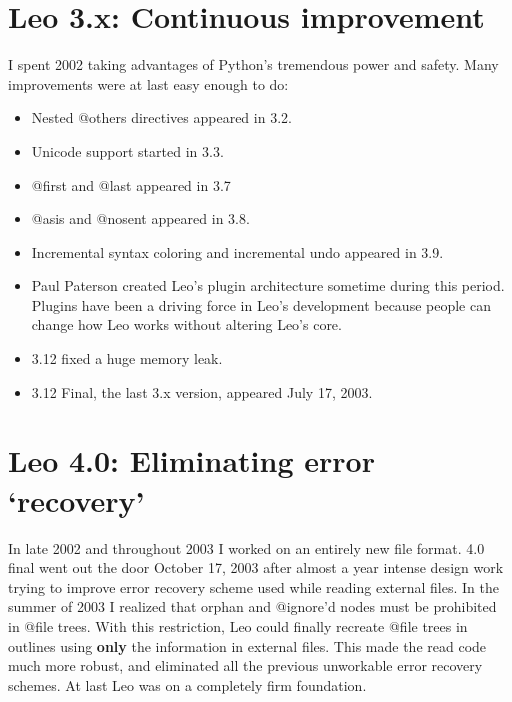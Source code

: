 \documentclass[a4paper,10pt,english]{sphinxmanual}
\begin{document}
\section{Leo 3.x: Continuous improvement}
\label{history:leo-3-x-continuous-improvement}
I spent 2002 taking advantages of Python's tremendous power and safety.
Many improvements were at last easy enough to do:
\begin{itemize}
\item {} 
Nested @others directives appeared in 3.2.

\item {} 
Unicode support started in 3.3.

\item {} 
@first and @last appeared in 3.7

\item {} 
@asis and @nosent appeared in 3.8.

\item {} 
Incremental syntax coloring and incremental undo appeared in 3.9.

\item {} 
Paul Paterson created Leo's plugin architecture sometime during this period.
Plugins have been a driving force in Leo's development because people can
change how Leo works without altering Leo's core.

\item {} 
3.12 fixed a huge memory leak.

\item {} 
3.12 Final, the last 3.x version, appeared July 17, 2003.

\end{itemize}


\section{Leo 4.0: Eliminating error `recovery'}
\label{history:leo-4-0-eliminating-error-recovery}
In late 2002 and throughout 2003 I worked on an entirely new file format.
4.0 final went out the door October 17, 2003 after almost a year intense
design work trying to improve error recovery scheme used while reading
external files. In the summer of 2003 I realized that orphan and @ignore'd
nodes must be prohibited in @file trees. With this restriction, Leo
could finally recreate @file trees in outlines using \textbf{only} the
information in external files. This made the read code much more robust, and
eliminated all the previous unworkable error recovery schemes. At last Leo
was on a completely firm foundation.
\end{document}

